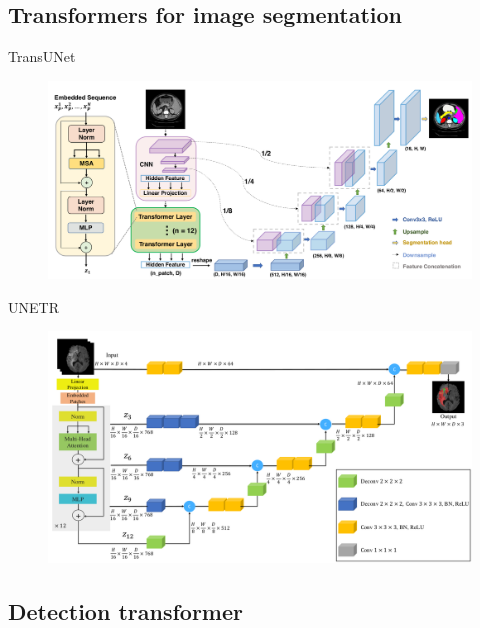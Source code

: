 \documentclass[xcolor=pdftex,dvipsnames,table,mathserif]{beamer}
\begin{document}
\subsection{Transformers for image segmentation}


\begin{frame}{TransUNet~\cite{chen_transunet_2021}}

\begin{figure}[ht]
  \centering
  \includegraphics[width=\textwidth]{TransUNet}
\end{figure}


\end{frame}


\begin{frame}{UNETR~\cite{hatamizadeh_unetr_2022}}

\begin{figure}[ht]
  \centering
  \includegraphics[width=\textwidth]{unetr}
\end{figure}

\end{frame}

\subsection{Detection transformer}
\end{document}
